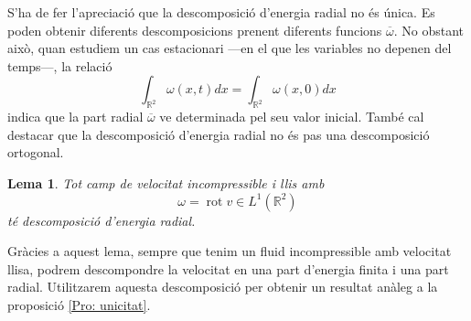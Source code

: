 \documentclass{article}
\numberwithin{equation}{section}
\DeclareMathOperator{\rot}{rot}
\newtheorem{lema}{Lema}[section]
\begin{document}
S'ha de fer l'apreciaci\'{o} que la descomposici\'{o} d'energia radial no \'{e}s \'{u}nica. Es poden obtenir diferents descomposicions prenent diferents funcions $\overline\omega$. No obstant aix\`{o}, quan estudiem un cas estacionari ---en el que les variables no depenen del temps---, la relaci\'{o}
\[\int_{\mathbb{R}^2}\omega(x,t)dx=\int_{\mathbb{R}^2}\omega(x,0)dx\]
indica que la part radial $\overline\omega$ ve determinada pel seu valor inicial. Tamb\'{e} cal destacar que la descomposici\'{o} d'energia radial no \'{e}s pas una descomposici\'{o} ortogonal.

\begin{lema}
Tot camp de velocitat incompressible i llis amb
\[\omega=\rot v\in L^1(\mathbb{R}^2)\]
t\'{e} descomposici\'{o} d'energia radial.
\end{lema}

Gr\`{a}cies a aquest lema, sempre que tenim un fluid incompressible amb velocitat llisa, podrem descompondre la velocitat en una part d'energia finita i una part radial. Utilitzarem aquesta descomposici\'{o} per obtenir un resultat an\`{a}leg a la proposici\'{o} \ref{Pro: unicitat}.
\end{document}
